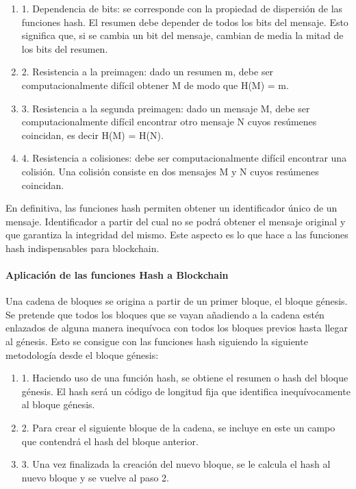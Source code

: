 \begin{enumerate}
	\item 1.	Dependencia de bits: se corresponde con la propiedad de dispersión de las funciones hash. El resumen debe depender de todos los bits del mensaje. Esto significa que, si se cambia un bit del mensaje, cambian de media la mitad de los bits del resumen.
	\item 2.	Resistencia a la preimagen: dado un resumen m, debe ser computacionalmente difícil obtener M de modo que H(M) = m.
	\item 3.	Resistencia a la segunda preimagen: dado un mensaje M, debe ser computacionalmente difícil encontrar otro mensaje N cuyos resúmenes coincidan, es decir H(M) = H(N).
	\item 4.	Resistencia a colisiones: debe ser computacionalmente difícil encontrar una colisión. Una colisión consiste en dos mensajes M y N cuyos resúmenes coincidan. 
\end{enumerate}

En definitiva, las funciones hash permiten obtener un identificador único de un mensaje. Identificador a partir del cual no se podrá obtener el mensaje original y que garantiza la integridad del mismo. Este aspecto es lo que hace a las funciones hash indispensables para blockchain.

\paragraph{Aplicación de las funciones Hash a Blockchain}
Una cadena de bloques se origina a partir de un primer bloque, el bloque génesis. Se pretende que todos los bloques que se vayan añadiendo a la cadena estén enlazados de alguna manera inequívoca con todos los bloques previos hasta llegar al génesis. Esto se consigue con las funciones hash siguiendo la siguiente metodología desde el bloque génesis:

\begin{enumerate}
	\item 1.	Haciendo uso de una función hash, se obtiene el resumen o hash del bloque génesis. El hash será un código de longitud fija que identifica inequívocamente al bloque génesis.
	\item 2.	Para crear el siguiente bloque de la cadena, se incluye en este un campo que contendrá el hash del bloque anterior.
	\item 3.	Una vez finalizada la creación del nuevo bloque, se le calcula el hash al nuevo bloque y se vuelve al paso 2.
\end{enumerate}

